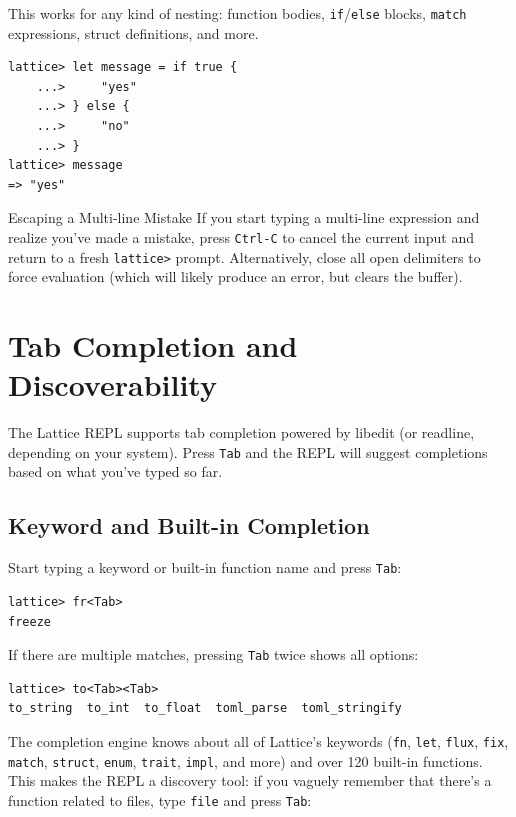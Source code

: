 This works for any kind of nesting: function bodies, \lstinline|if|/\lstinline|else| blocks, \lstinline|match| expressions, struct definitions, and more.

\begin{lstlisting}[language=Lattice, numbers=none]
lattice> let message = if true {
    ...>     "yes"
    ...> } else {
    ...>     "no"
    ...> }
lattice> message
=> "yes"
\end{lstlisting}

\begin{tipbox}{Escaping a Multi-line Mistake}
If you start typing a multi-line expression and realize you've made a mistake, press \texttt{Ctrl-C} to cancel the current input and return to a fresh \lstinline|lattice>| prompt.
Alternatively, close all open delimiters to force evaluation (which will likely produce an error, but clears the buffer).
\end{tipbox}

\section{Tab Completion and Discoverability}\label{sec:tab-completion}

The Lattice REPL supports tab completion powered by libedit (or readline, depending on your system).
Press \texttt{Tab} and the REPL will suggest completions based on what you've typed so far.

\subsection{Keyword and Built-in Completion}\label{subsec:keyword-completion}

Start typing a keyword or built-in function name and press \texttt{Tab}:

\begin{lstlisting}[numbers=none]
lattice> fr<Tab>
freeze
\end{lstlisting}

If there are multiple matches, pressing \texttt{Tab} twice shows all options:

\begin{lstlisting}[numbers=none]
lattice> to<Tab><Tab>
to_string  to_int  to_float  toml_parse  toml_stringify
\end{lstlisting}

The completion engine knows about all of Lattice's keywords (\lstinline|fn|, \lstinline|let|, \lstinline|flux|, \lstinline|fix|, \lstinline|match|, \lstinline|struct|, \lstinline|enum|, \lstinline|trait|, \lstinline|impl|, and more) and over 120 built-in functions.
This makes the REPL a discovery tool: if you vaguely remember that there's a function related to files, type \lstinline|file| and press \texttt{Tab}:

